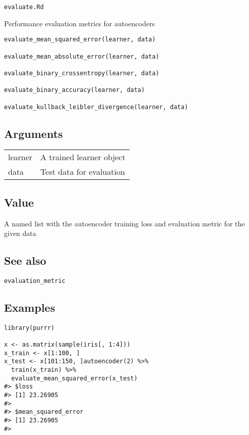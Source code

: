\texttt{evaluate.Rd}

Performance evaluation metrics for autoencoders

\begin{verbatim}
evaluate_mean_squared_error(learner, data)

evaluate_mean_absolute_error(learner, data)

evaluate_binary_crossentropy(learner, data)

evaluate_binary_accuracy(learner, data)

evaluate_kullback_leibler_divergence(learner, data)
\end{verbatim}

\hypertarget{arguments}{\subsection{\texorpdfstring{\protect\hyperlink{arguments}{}Arguments}{Arguments}}\label{arguments}}

\begin{longtable}[c]{@{}>{\small}p{3cm}>{\raggedright}p{12.5cm}@{}}
\toprule
learner & A trained learner object\tabularnewline
data & Test data for evaluation\tabularnewline
\bottomrule
\end{longtable}

\hypertarget{value}{\subsection{\texorpdfstring{\protect\hyperlink{value}{}Value}{Value}}\label{value}}

A named list with the autoencoder training loss and evaluation metric
for the given data

\hypertarget{see-also}{\subsection{\texorpdfstring{\protect\hyperlink{see-also}{}See
also}{See also}}\label{see-also}}

\texttt{evaluation\_metric}

\hypertarget{examples}{\subsection{\texorpdfstring{\protect\hyperlink{examples}{}Examples}{Examples}}\label{examples}}

\begin{verbatim}
library(purrr)

x <- as.matrix(sample(iris[, 1:4]))
x_train <- x[1:100, ]
x_test <- x[101:150, ]autoencoder(2) %>%
  train(x_train) %>%
  evaluate_mean_squared_error(x_test)
#> $loss
#> [1] 23.26905
#> 
#> $mean_squared_error
#> [1] 23.26905
#> 
\end{verbatim}

